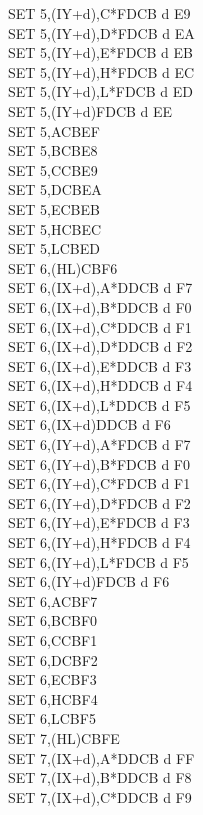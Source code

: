 \documentclass[oneside,a4paper]{book}
\begin{document}
\begin{multicols}{3}
{\begin{tabbing}
SET 5,(IY+d),C*\>FDCB d E9\\
SET 5,(IY+d),D*\>FDCB d EA\\
SET 5,(IY+d),E*\>FDCB d EB\\
SET 5,(IY+d),H*\>FDCB d EC\\
SET 5,(IY+d),L*\>FDCB d ED\\
SET 5,(IY+d)\>FDCB d EE\\
SET 5,A\>CBEF\\
SET 5,B\>CBE8\\
SET 5,C\>CBE9\\
SET 5,D\>CBEA\\
SET 5,E\>CBEB\\
SET 5,H\>CBEC\\
SET 5,L\>CBED\\
SET 6,(HL)\>CBF6\\
SET 6,(IX+d),A*\>DDCB d F7\\
SET 6,(IX+d),B*\>DDCB d F0\\
SET 6,(IX+d),C*\>DDCB d F1\\
SET 6,(IX+d),D*\>DDCB d F2\\
SET 6,(IX+d),E*\>DDCB d F3\\
SET 6,(IX+d),H*\>DDCB d F4\\
SET 6,(IX+d),L*\>DDCB d F5\\
SET 6,(IX+d)\>DDCB d F6\\
SET 6,(IY+d),A*\>FDCB d F7\\
SET 6,(IY+d),B*\>FDCB d F0\\
SET 6,(IY+d),C*\>FDCB d F1\\
SET 6,(IY+d),D*\>FDCB d F2\\
SET 6,(IY+d),E*\>FDCB d F3\\
SET 6,(IY+d),H*\>FDCB d F4\\
SET 6,(IY+d),L*\>FDCB d F5\\
SET 6,(IY+d)\>FDCB d F6\\
SET 6,A\>CBF7\\
SET 6,B\>CBF0\\
SET 6,C\>CBF1\\
SET 6,D\>CBF2\\
SET 6,E\>CBF3\\
SET 6,H\>CBF4\\
SET 6,L\>CBF5\\
SET 7,(HL)\>CBFE\\
SET 7,(IX+d),A*\>DDCB d FF\\
SET 7,(IX+d),B*\>DDCB d F8\\
SET 7,(IX+d),C*\>DDCB d F9\\

\end{tabbing}}
\end{multicols}
\end{document}

